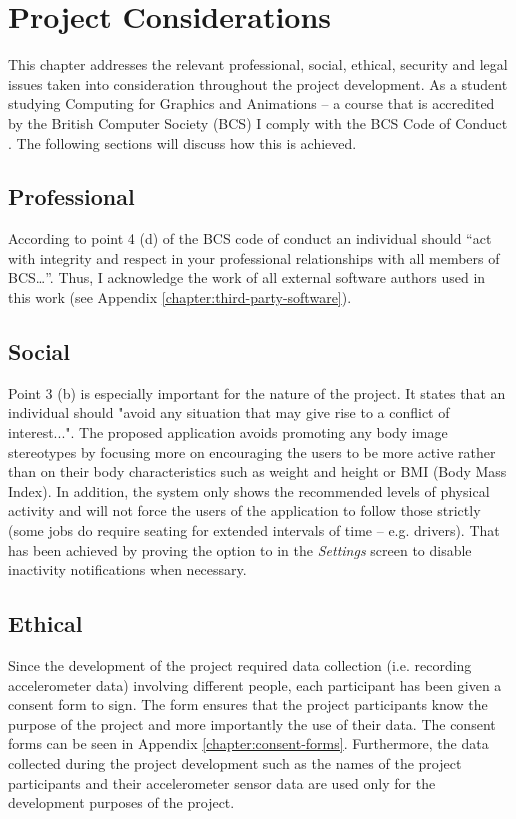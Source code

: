 \chapter{Project Considerations}
This chapter addresses the relevant professional, social, ethical, security and legal issues taken into consideration throughout the project development. As a student studying Computing for Graphics and Animations – a course that is accredited by the British Computer Society (BCS) I comply with the BCS Code of Conduct \citep{bcs_2017}. The following sections will discuss how this is achieved.
    
    \section{Professional}
    According to point 4 (d) of the BCS code of conduct an individual should “act with integrity and respect in your professional relationships with all members of BCS…”. Thus, I acknowledge the work of all external software authors used in this work (see Appendix \ref{chapter:third-party-software}).

    \section{Social}
    Point 3 (b) is especially important for the nature of the project. It states that an individual should "avoid any situation that may give rise to a conflict of interest...". The proposed application avoids promoting any body image stereotypes by focusing more on encouraging the users to be more active rather than on their body characteristics such as weight and height or BMI (Body Mass Index). In addition, the system only shows the recommended levels of physical activity and will not force the users of the application to follow those strictly (some jobs do require seating for extended intervals of time – e.g. drivers). That has been achieved by proving the option to in the \textit{Settings} screen to disable inactivity notifications when necessary.
    
    \section{Ethical}
    Since the development of the project required data collection (i.e. recording accelerometer data) involving different people, each participant has been given a consent form to sign. The form ensures that the project participants know the purpose of the project and more importantly the use of their data. The consent forms can be seen in Appendix \ref{chapter:consent-forms}. Furthermore, the data collected during the project development such as the names of the project participants and their accelerometer sensor data are used only for the development purposes of the project. 
    
